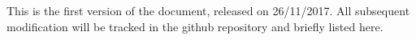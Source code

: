 This is the first version of the document, released on 26/11/2017.
All subsequent modification will be tracked in the github repository and briefly listed here.